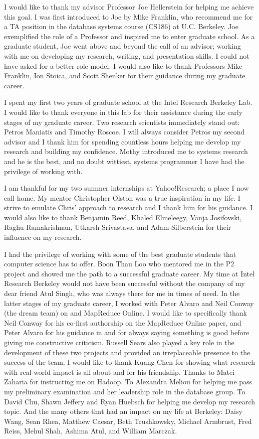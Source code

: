 
I would like to thank my advisor Professor Joe Hellerstein for helping me
achieve this goal.  I was first introduced to Joe by Mike Franklin, who
recommend me for a TA position in the database systems course (CS186) at U.C.\@
Berkeley.  Joe exemplified the role of a Professor and inspired me to enter
graduate school.  As a graduate student, Joe went above and beyond the call of
an advisor; working with me on developing my research, writing, and
presentation skills.  I could not have asked for a better role model.  I would
also like to thank Professors Mike Franklin, Ion Stoica, and Scott Shenker for
their guidance during my graduate career.

I spent my first two years of graduate school at the Intel Research Berkeley
Lab.  I would like to thank everyone in this lab for their assistance during
the early stages of my graduate career.  Two research scientists immediately
stand out: Petros Maniatis and Timothy Roscoe.  I will always consider Petros
my second advisor and I thank him for spending countless hours helping me
develop my research and building my confidence.  Mothy introduced me to systems
research and he is the best, and no doubt wittiest, systems programmer I have
had the privilege of working with.

I am thankful for my two summer internships at Yahoo!\@ Research; a place I now
call home.  My mentor Christopher Olston was a true inspiration in my life.  I
strive to emulate Chris' approach to research and I thank him for his guidance.
I would also like to thank Benjamin Reed, Khaled Elmeleegy, Vanja Josifovski,
Raghu Ramakrishnan, Utkarsh Srivastava, and Adam Silberstein for their
influence on my research.

I had the privilege of working with some of the best graduate students that
computer science has to offer.  Boon Thau Loo who mentored me in the P2 project
and showed me the path to a successful graduate career.  My time at Intel
Research Berkeley would not have been successful without the company of my dear
friend Atul Singh, who was always there for me in times of need.  In the latter
stages of my graduate career, I worked with Peter Alvaro and Neil Conway (the
dream team) on \BOOMA and MapReduce Online.  I would like to specifically thank
Neil Conway for his co-first authorship on the MapReduce Online paper, and
Peter Alvaro for his guidance in \BOOMA and for always saying something is good
before giving me constructive criticism.  Russell Sears also played a key role
in the development of these two projects and provided an irreplaceable presence
to the success of the \BOOM team.  I would like to thank Kuang Chen for showing
what research with real-world impact is all about and for his friendship.
Thanks to Matei Zaharia for instructing me on Hadoop.  To Alexandra Meliou for
helping me pass my preliminary examination and her leadership role in the
database group. To David Chu, Shawn Jeffery and Ryan Huebsch for helping me
develop my research topic.  And the many others that had an impact on my life
at Berkeley: Daisy Wang, Sean Rhea, Matthew Caesar, Beth Trushkowsky, Michael
Armbrust, Fred Reiss, Mehul Shah, Ashima Atul, and William Marczak.

